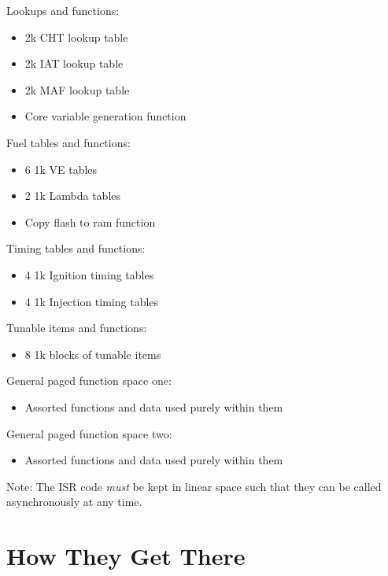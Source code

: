 \documentclass[12pt,a4wide,titlepage]{article}
\begin{document}
Lookups and functions:

\begin{itemize}
\item 2k CHT lookup table
\item 2k IAT lookup table
\item 2k MAF lookup table
\item Core variable generation function
\end{itemize}


Fuel tables and functions:

\begin{itemize}
\item 6 1k VE tables
\item 2 1k Lambda tables
\item Copy flash to ram function
\end{itemize}


Timing tables and functions:

\begin{itemize}
\item 4 1k Ignition timing tables
\item 4 1k Injection timing tables
\end{itemize}


Tunable items and functions:

\begin{itemize}
\item 8 1k blocks of tunable items
\end{itemize}


General paged function space one:

\begin{itemize}
\item Assorted functions and data used purely within them
\end{itemize}


General paged function space two:

\begin{itemize}
\item Assorted functions and data used purely within them
\end{itemize}


Note: The ISR code \emph{must} be kept in linear space such that they can be
called asynchronously at any time.




\section{How They Get There}
\end{document}
